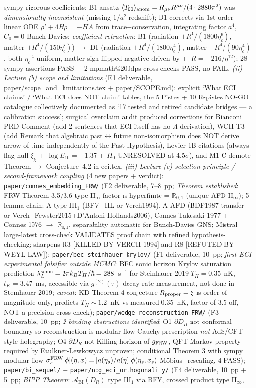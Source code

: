 \documentclass[reprint,amsmath,amssymb,aps,prd,superscriptaddress]{revtex4-2}
\providecommand{\R}{\mathbb{R}}
\providecommand{\1}{\mathbf{1}}
\begin{document}
sympy-rigorous coefficients: B1 ansatz $\langle T_{00}\rangle_{\rm anom}=R_{\mu\nu}R^{\mu\nu}/(4\cdot 2880\pi^2)$ was \emph{dimensionally inconsistent} (missing $1/a^2$ redshift); D1 corrects via 1st-order linear ODE $\rho'+4H\rho=-HA$ from trace+conservation, integrating factor $a^4$, $C_0=0$ Bunch-Davies; \emph{coefficient retraction}: B1 (radiation $+R^4/(1800\eta_c^6)$, matter $+R^4/(150\eta_c^8)$) $\to$ D1 (radiation $+R^4/(1800\eta_c^4)$, matter $-R^4/(90\eta_c^4)$, both $\eta_c^{-4}$ uniform, matter sign flipped negative driven by $\Box R = -216/\eta^{12}$); 28 sympy assertions PASS + 2 mpmath@200dps cross-checks PASS, no FAIL. \emph{(ii) Lecture (b) scope and limitations} (E1 deliverable, paper/scope\_and\_limitations.tex + paper/SCOPE.md): explicit `What ECI claims' / `What ECI does NOT claim' tables; the 5 Pistes + 10 R-pistes NO-GO catalogue collectively documented as `17 tested and retired candidate bridges --- a calibration success'; surgical overclaim audit produced corrections for Bianconi PRD Comment (add 2 sentences that ECI itself has no $\Lambda$ derivation), WCH T3 (add Remark that algebraic past$\leftrightarrow$future non-isomorphism does NOT derive arrow of time independently of the Past Hypothesis), Levier 1B citations (always flag null $\xi_\chi$ + $\log B_{10}=-1.37$ + $H_0$ UNRESOLVED at 4.5$\sigma$), and M1-C demote Theorem $\to$ Conjecture~4.2 in eci.tex. \emph{(iii) Lecture (c) selection-principle / second-framework coupling} (4 new papers + verdict): \texttt{paper/connes\_embedding\_FRW/} (F2 deliverable, 7--8~pp; \emph{Theorem established}: FRW Theorem 3.5/3.6 type II$_\infty$ factor is hyperfinite = $\R_{0,1}$ (unique AFD II$_\infty$); 5-lemma chain: A type III$_1$ (BFV+HL or Verch1994), A AFD (BDF1987 transfer or Verch+Fewster2015+D'Antoni-Hollands2006), Connes-Takesaki 1977 + Connes 1976 $\to$ $\R_{0,1}$, separability automatic for Bunch-Davies GNS; Mistral large-latest cross-check VALIDATES proof chain with refined hypothesis-checking; sharpens R3 [KILLED-BY-VERCH-1994] and R8 [REFUTED-BY-WEYL-LAW]); \texttt{paper/bec\_steinhauer\_krylov/} (F1 deliverable, 10~pp; \emph{first ECI experimental falsifier outside MCMC}: BEC sonic horizon Krylov saturation prediction $\lambda_L^{\rm sonic} = 2\pi k_B T_H/\hbar = 288$~s$^{-1}$ for Steinhauer 2019 $T_H=0.35$~nK, $t_K=3.47$~ms, accessible via $g^{(2)}(\tau)$ decay rate measurement, not done in Steinhauer 2019; \emph{caveat}: KD Theorem 4 conjecture $R_{\rm proper}=\xi$ is order-of-magnitude only, predicts $T_H\sim 1.2$~nK vs measured $0.35$~nK, factor of $3.5$ off, NOT a precision cross-check); \texttt{paper/wedge\_reconstruction\_FRW/} (F3 deliverable, 10~pp; \emph{2 binding obstructions identified}: O1 $\partial D_R$ not conformal boundary so reconstruction is modular-flow Cauchy prescription \emph{not} AdS/CFT-style holography; O4 $\partial D_R$ not Killing horizon of $g_{\rm FRW}$, QFT Markov property required by Faulkner-Lewkowycz unproven; conditional Theorem 3 with sympy modular flow $\sigma_s^{\rm FRW}[\phi](\eta,x) = [a(\eta_s)/a(\eta)]\phi(\eta_s,x_s)$ M\"obius+rescaling, 4 PASS); \texttt{paper/bi\_sequel/} + \texttt{paper/ncg\_eci\_orthogonality/} (F4 deliverable, 10~pp + 5~pp; \emph{BIPP Theorem}: $\mathcal{A}_\mathrm{BI}(D_R)$ type III$_1$ via BFV, crossed product type II$_\infty$, 
\end{document}
